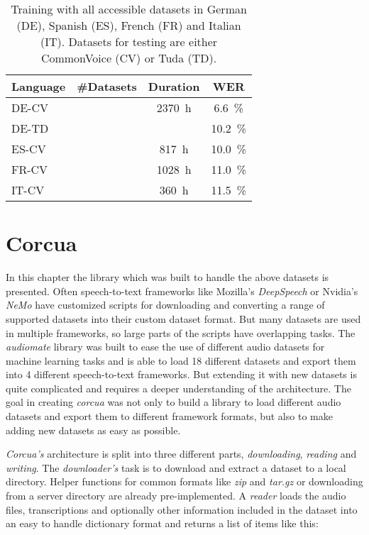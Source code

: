 \documentclass[a4paper]{article}
\begin{document}
\begin{table}[!htbp]
	\caption{Training with all accessible datasets  in German (DE), Spanish (ES), French (FR) and Italian (IT). Datasets for testing are either CommonVoice (CV) or Tuda (TD).}
	\label{tab:tads}
	\centering
	\begin{tabular}{llcc}
		\toprule
		\textbf{Language} & \textbf{\#Datasets} & \textbf{Duration} & \textbf{WER} \\
		\midrule
		DE-CV &  & \SI{2370}{\hour}  & \SI{6.6}{\percent} \\
		DE-TD &  &   & \SI{10.2}{\percent} \\
		\midrule
		ES-CV &  & \SI{817}{\hour}  & \SI{10.0}{\percent} \\
		FR-CV &  & \SI{1028}{\hour}  & \SI{11.0}{\percent} \\
		IT-CV &  & \SI{360}{\hour}  & \SI{11.5}{\percent} \\
		\bottomrule
	\end{tabular}
\end{table}

\section{Corcua}
\label{sec:corcua}

In this chapter the library which was built to handle the above datasets is presented.
Often speech-to-text frameworks like Mozilla's \textit{DeepSpeech} or Nvidia's \textit{NeMo} have customized scripts for downloading and converting a range of supported datasets into their custom dataset format. But many datasets are used in multiple frameworks, so large parts of the scripts have overlapping tasks.
The \textit{audiomate} \cite{AUDMAT} library was built to ease the use of different audio datasets for machine learning tasks and is able to load 18 different datasets and export them into 4 different speech-to-text frameworks. But extending it with new datasets is quite complicated and requires a deeper understanding of the architecture.
The goal in creating \textit{corcua} was not only to build a library to load different audio datasets and export them to different framework formats, but also to make adding new datasets as easy as possible.

\vspace{9pt}
\textit{Corcua's} architecture is split into three different parts, \textit{downloading}, \textit{reading} and \textit{writing}.
The \textit{downloader's} task is to download and extract a dataset to a local directory. Helper functions for common formats like \textit{zip} and \textit{tar.gz} or downloading from a server directory are already pre-implemented.
A \textit{reader} loads the audio files, transcriptions and optionally other information included in the dataset into an easy to handle dictionary format and returns a list of items like this:
\end{document}
